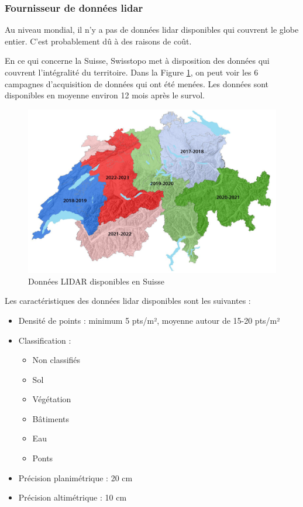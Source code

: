 \subsubsection{Fournisseur de données \gls{lidar}}

Au niveau mondial, il n'y a pas de données \gls{lidar} disponibles qui couvrent le globe entier. C'est probablement dû à des raisons de coût.

En ce qui concerne la Suisse, Swisstopo \cite{swisstopo_acquisition_2024} met à disposition des données qui couvrent l'intégralité du territoire. Dans la Figure \ref{fig:A1_17_swisstopo_lidar}, on peut voir les 6 campagnes d'acquisition de données qui ont été menées. Les données sont disponibles en moyenne environ 12 mois après le survol.

\begin{figure}[H]
    \centering
    \includegraphics[width=1\linewidth]{03-tail//A1_fondamentaux_ML//A1_figures/A1_17_swisstopo_lidar.png}
    \caption{Données LIDAR disponibles en Suisse \cite{swisstopo_acquisition_2024}}
    \label{fig:A1_17_swisstopo_lidar}
\end{figure}

Les caractéristiques des données \gls{lidar} disponibles sont les suivantes :
\begin{itemize}
    \item Densité de points : minimum 5 pts/m², moyenne autour de 15-20 pts/m²
    \item Classification :
    \begin{itemize}
        \item Non classifiés
        \item Sol
        \item Végétation
        \item Bâtiments
        \item Eau
        \item Ponts
    \end{itemize}
    \item Précision planimétrique : 20 cm
    \item Précision altimétrique : 10 cm
\end{itemize}

